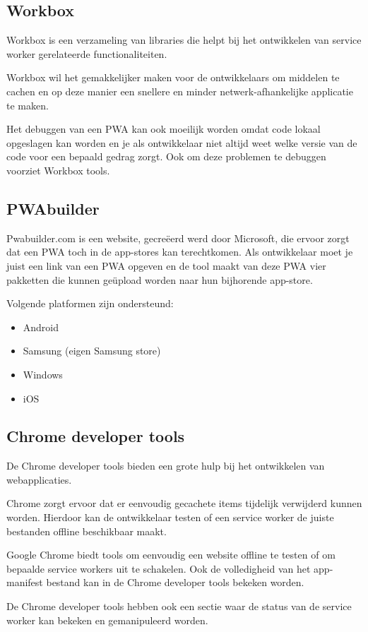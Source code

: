		
\newpage
\subsection{Workbox}

	Workbox is een verzameling van libraries die helpt bij het ontwikkelen van service worker gerelateerde functionaliteiten.
	
	Workbox wil het gemakkelijker maken voor de ontwikkelaars om middelen te cachen en op deze manier een snellere en minder netwerk-afhankelijke applicatie te maken.
	
	Het debuggen van een PWA kan ook moeilijk worden omdat code lokaal opgeslagen kan worden en je als ontwikkelaar niet altijd weet welke versie van de code voor een bepaald gedrag zorgt. Ook om deze problemen te debuggen voorziet Workbox tools.
	\autocite{Workbox2020}
	

\subsection{PWAbuilder}

	Pwabuilder.com is een website, gecreëerd werd door Microsoft, die ervoor zorgt dat een PWA toch in de app-stores kan terechtkomen. Als ontwikkelaar moet je juist een link van een PWA opgeven en de tool maakt van deze PWA vier pakketten die kunnen geüpload worden naar hun bijhorende app-store. 
	
	Volgende platformen zijn ondersteund:
	
	\begin{itemize}
		\item	Android
		\item	Samsung (eigen Samsung store)
		\item	Windows
		\item	iOS
	\end{itemize}
	\autocite{PWAbuilder2020}
	
	
\subsection{Chrome developer tools}
	De Chrome developer tools bieden een grote hulp bij het ontwikkelen van webapplicaties.
	
	Chrome zorgt ervoor dat er eenvoudig gecachete items tijdelijk verwijderd kunnen worden. Hierdoor kan de ontwikkelaar testen of een service worker de juiste bestanden offline beschikbaar maakt.
	
	Google Chrome biedt tools om eenvoudig een website offline te testen of om bepaalde service workers uit te schakelen.
	Ook de volledigheid van het app-manifest bestand kan in de Chrome developer tools bekeken worden.
	
	De Chrome developer tools hebben ook een sectie waar de status van de service worker kan bekeken en gemanipuleerd worden.
	\autocite{Developers2019b}
	

	
	